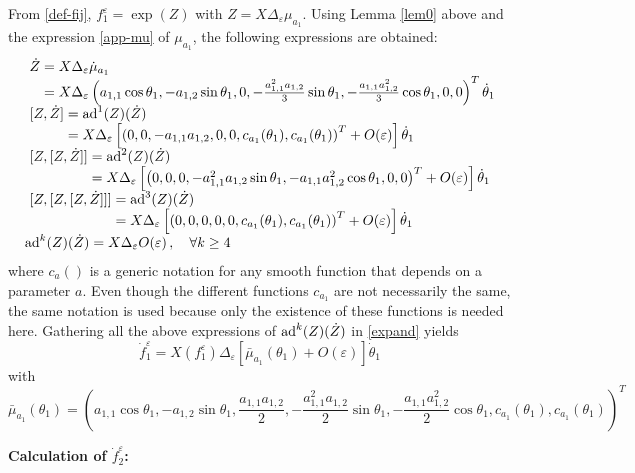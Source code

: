 \documentclass[a4paper,twoside]{article}
\def \ad {\textnormal{ad}}
\def \eps {\varepsilon}
\begin{document}
From \eqref{def-fij}, $f_1^\eps= \exp(Z)$ with $Z= X \Delta_\eps \mu_{a_1}$. 
Using Lemma \ref{lem0} above and the expression \eqref{app-mu} of $\mu_{a_1}$, 
the following expressions are obtained:
\[
\begin{array}{l}
~\dot Z =  X \Delta_\eps \dot \mu_{a_1} \\
 \phantom{~\dot Z } =  X \Delta_\eps  \left( a_{1,1} \cos \theta_1, -a_{1,2} \sin \theta_1,0,
- \frac{a_{1,1}^2 a_{1,2}}{3} \sin \theta_1, - \frac{a_{1,1}a_{1,2}^2}{3} \cos \theta_1,0,0 \right)^T \dot \theta_1 \\
~[Z,\dot Z]  =  \ad^1(Z)(\dot Z) \\
\phantom{~[Z, \dot Z] }   = X \Delta_\eps \left[ \left(0,0,-a_{1,1}a_{1,2},0,0, c_{a_1}(\theta_1),c_{a_1}(\theta_1) 
\right)^T +O(\eps) \right] \dot \theta_1 \\
~[Z,[Z,\dot Z]]   =  \ad^2(Z)(\dot Z) \\
\phantom{~[Z,[Z,\dot Z]]}   = X \Delta_\eps \left[\left(0,0,0,-a_{1,1}^2 a_{1,2} \sin \theta_1,-a_{1,1}a_{1,2}^2 
\cos \theta_1,0,0\right)^T+ O(\eps) \right] \dot \theta_1 \\
~[Z,[Z,[Z,\dot Z]]]  =  \ad^3(Z)(\dot Z) \\
\phantom{~[Z,[Z,[Z,\dot Z]]]}   =  X \Delta_\eps \left[\left(0,0,0,0,0,c_{a_1}(\theta_1), c_{a_1}(\theta_1)\right)^T 
+ O(\eps) \right] 
\dot \theta_1 \\
\ad^k(Z) (\dot Z)= X \Delta_\eps O(\eps) \, , \quad \forall k \geq 4
\end{array}
\]
where $c_{a}()$ is a generic notation for any smooth function that depends on a parameter $a$. Even though the different
functions $c_{a_1}$ are not necessarily the same, the same notation is used because only the existence of these functions
is needed here. Gathering all the above expressions of $\ad^k(Z) (\dot Z)$ in \eqref{expand} yields
\begin{equation}
\label{df2}
\dot f_1^\eps= X(f_1^\eps) \Delta_\eps [\bar \mu_{a_1}(\theta_1)+O(\eps)] \dot \theta_1
\end{equation}
with
\begin{equation}
\label{defmu2}
\bar \mu_{a_1}(\theta_1)=
\left(a_{1,1} \cos \theta_1, -a_{1,2} \sin \theta_1,\frac{a_{1,1}a_{1,2}}{2}, -\frac{a_{1,1}^2a_{1,2}}{2} \sin \theta_1, 
- \frac{a_{1,1}a_{1,2}^2}{2} \cos \theta_1, c_{a_1}(\theta_1),c_{a_1}(\theta_1) \right)^T
\end{equation}
\vspace*{.2cm}

\noindent \textbf{Calculation of $\dot f_2^\eps$:} 
\end{document}
